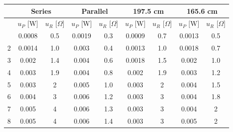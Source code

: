 \documentclass{article}
\begin{document}
{\begin{table}[H]\centering
    \begin{tabular}{ccc||cc||cc||cc}
        \toprule
           & \multicolumn{2}{c||}{Series} & \multicolumn{2}{c||}{Parallel} & \multicolumn{2}{c||}{197.5 cm} & \multicolumn{2}{c}{165.6 cm}                                                               \\
        \midrule
           & $u_P$ [W]                    & $u_R$ [$\Omega$]               & $u_P$ [W]                      & $u_R$ [$\Omega$]             & $u_P$ [W] & $u_R$ [$\Omega$] & $u_P$ [W] & $u_R$ [$\Omega$] \\
        \mi
        1  & 0.0008                       & 0.5                            & 0.0019                         & 0.3                          & 0.0009    & 0.7              & 0.0013    & 0.5              \\
        2  & 0.0014                       & 1.0                            & 0.003                          & 0.4                          & 0.0013    & 1.0              & 0.0018    & 0.7              \\
        3  & 0.002                        & 1.4                            & 0.004                          & 0.6                          & 0.0018    & 1.5              & 0.002     & 1.0              \\
        4  & 0.003                        & 1.9                            & 0.004                          & 0.8                          & 0.002     & 1.9              & 0.003     & 1.2              \\
        5  & 0.003                        & 2                              & 0.005                          & 1.0                          & 0.003     & 2                & 0.004     & 1.5              \\
        6  & 0.004                        & 3                              & 0.006                          & 1.2                          & 0.003     & 3                & 0.004     & 1.8              \\
        7  & 0.005                        & 4                              & 0.006                          & 1.3                          & 0.003     & 3                & 0.004     & 2                \\
        8  & 0.005                        & 4                              & 0.006                          & 1.4                          & 0.003     & 3                & 0.005     & 2                \\

\end{tabular}
\end{table}}
\end{document}
